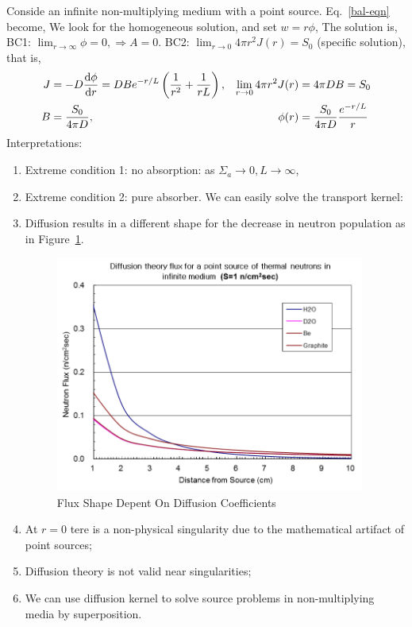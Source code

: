 \documentclass{school-22.211-notes}
\begin{document}
\clearpage
{}
Conside an infinite non-multiplying medium with a point source. Eq.~\ref{bal-eqn} become,
We look for the homogeneous solution, and set $w = r \phi$, 
The solution is, 
BC1: $\lim_{r\to \infty} \phi = 0, \Rightarrow A=0$. BC2: $\lim_{r\to 0} 4 \pi r^2 J(r) = S_0$ (specific solution), that is, 
\begin{align}
J &= -D \frac{\mathrm{d}\phi}{\mathrm{d}r} = DBe^{-r/L} \left( \frac{1}{r^2} + \frac{1}{rL} \right), 
&\lim_{r\to 0} 4 \pi r^2 J(r) &= 4 \pi DB = S_0 \\
B &= \frac{S_0}{4 \pi D}, & \phi(r) &= \frac{S_0}{4\pi D} \frac{e^{-r/L}}{r} 
\end{align}
Interpretations:
\begin{enumerate}
\item Extreme condition 1: no absorption: as $\Sigma_a \to 0, L\to \infty$, 
\item Extreme condition 2: pure absorber. We can easily solve the transport kernel: 
\item Diffusion results in a different shape for the decrease in neutron population as in Figure~\ref{dfs-shape}.
  \begin{figure}
    \centering
    \includegraphics[width=4in]{images/dfs/dfs-shape.png}
    \caption{Flux Shape Depent On Diffusion Coefficients}\label{dfs-shape}
  \end{figure}
\item At $r=0$ tere is a non-physical singularity due to the mathematical artifact of point sources;
\item Diffusion theory is not valid near singularities;
\item We can use diffusion kernel to solve source problems in non-multiplying media by superposition.
\end{enumerate}
\end{document}
